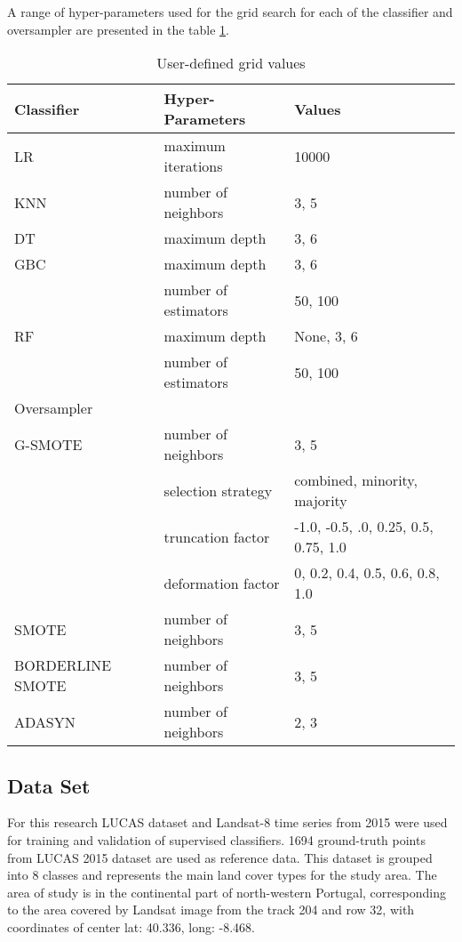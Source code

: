 \documentclass[parskip=full]{scrartcl}
\begin{document}
A range of hyper-parameters used for the grid search for each of the
classifier and oversampler are presented in the table \ref{tab:datasets}.

\begin{table}[H]
	\centering
	\begin{tabular}{lll}
		\toprule
		Classifier       & Hyper-Parameters & Values\\
		\hline
		LR               & maximum iterations   & 10000   \\
		KNN              & number of neighbors  & {3, 5} \\
		DT               & maximum depth        & {3, 6} \\
		GBC              & maximum depth        & {3, 6} \\
    			 		 & number of estimators & {50, 100} \\
		RF               & maximum depth        & {None, 3, 6} \\
				 		 & number of estimators & {50, 100} \\
		\toprule
		Oversampler      &                      & \\
		\hline
		G-SMOTE          & number of neighbors  & {3, 5} \\
				 		 & selection strategy   & combined, minority, majority\\
				 		 & truncation factor    & {-1.0, -0.5, .0, 0.25,
				 		 0.5, 0.75, 1.0} \\
				 		 & deformation factor   & {0, 0.2, 0.4, 0.5,
				 		 0.6, 0.8, 1.0} \\
 		SMOTE            & number of neighbors & {3, 5} \\
		BORDERLINE SMOTE & number of neighbors & {3, 5} \\
		ADASYN           & number of neighbors & {2, 3} \\
		\bottomrule
	\end{tabular}
	\caption{\label{tab:datasets}User-defined grid values}
\end{table}


\subsection{Data Set}

For this research LUCAS dataset and Landsat-8 time series from 2015 were used
for training and validation of supervised classifiers. 1694 ground-truth points 
from LUCAS 2015 dataset are used as reference data. This dataset is grouped 
into 8 classes and represents the main land cover types for the study area. The 
area of study is in the continental part of north-western Portugal, 
corresponding to the area covered by Landsat image from the track 204 and row 
32, with coordinates of center lat: 40.336, long: -8.468. 
\end{document}
